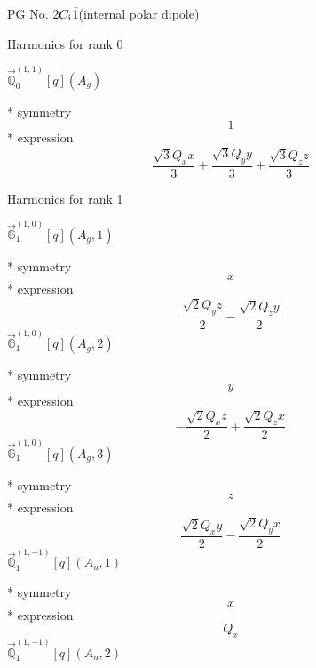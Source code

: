 \documentclass[fleqn,8pt]{jsarticle}
\begin{document}
\setcounter{MaxMatrixCols}{32}

\renewcommand{\tablename}{Table~}
\renewcommand{\figurename}{Figure~}
\begin{center}
\LARGE
PG No. 2\quad$C_{\rm i}$\quad$\bar{1}$\quad[ triclinic ] (internal polar dipole)
\end{center}

\noindent * Harmonics for rank 0

\noindent\quad $\vec{\mathbb{Q}}_{0}^{(1,1)}[q](A_{g})$

\noindent\quad ** symmetry
\begin{dmath*}
1
\end{dmath*}
\noindent\quad ** expression
\begin{dmath*}
\frac{\sqrt{3} Q_{x} x}{3} + \frac{\sqrt{3} Q_{y} y}{3} + \frac{\sqrt{3} Q_{z} z}{3}
\end{dmath*}

\noindent * Harmonics for rank 1

\noindent\quad $\vec{\mathbb{G}}_{1}^{(1,0)}[q](A_{g},1)$

\noindent\quad ** symmetry
\begin{dmath*}
x
\end{dmath*}
\noindent\quad ** expression
\begin{dmath*}
\frac{\sqrt{2} Q_{y} z}{2} - \frac{\sqrt{2} Q_{z} y}{2}
\end{dmath*}
\noindent\quad $\vec{\mathbb{G}}_{1}^{(1,0)}[q](A_{g},2)$

\noindent\quad ** symmetry
\begin{dmath*}
y
\end{dmath*}
\noindent\quad ** expression
\begin{dmath*}
- \frac{\sqrt{2} Q_{x} z}{2} + \frac{\sqrt{2} Q_{z} x}{2}
\end{dmath*}
\noindent\quad $\vec{\mathbb{G}}_{1}^{(1,0)}[q](A_{g},3)$

\noindent\quad ** symmetry
\begin{dmath*}
z
\end{dmath*}
\noindent\quad ** expression
\begin{dmath*}
\frac{\sqrt{2} Q_{x} y}{2} - \frac{\sqrt{2} Q_{y} x}{2}
\end{dmath*}
\noindent\quad $\vec{\mathbb{Q}}_{1}^{(1,-1)}[q](A_{u},1)$

\noindent\quad ** symmetry
\begin{dmath*}
x
\end{dmath*}
\noindent\quad ** expression
\begin{dmath*}
Q_{x}
\end{dmath*}
\noindent\quad $\vec{\mathbb{Q}}_{1}^{(1,-1)}[q](A_{u},2)$
\end{document}
